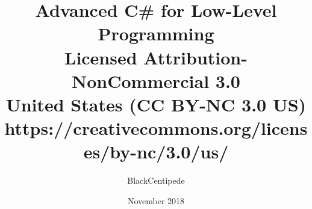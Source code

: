 \documentclass{book}
\begin{document}
\author{BlackCentipede}
\title{Advanced C\# for Low-Level Programming\\
	   \large Licensed Attribution-NonCommercial 3.0 
	   \\United States (CC BY-NC 3.0 US) \\
   	   \small https://creativecommons.org/licenses/by-nc/3.0/us/}
\date{November 2018}

\frontmatter

\maketitle
\newpage

\tableofcontents

\mainmatter





\backmatter
\end{document}
